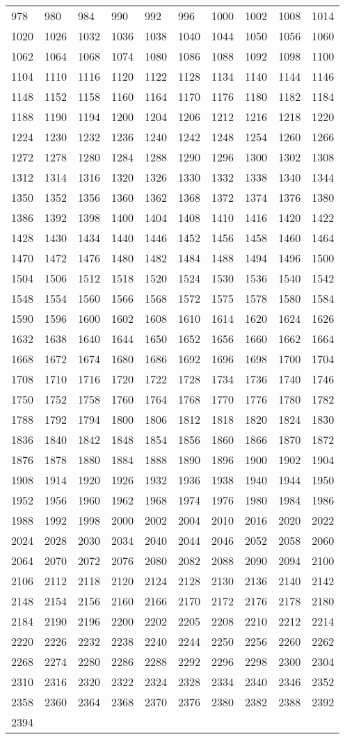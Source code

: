 \begin{longtable}{*{10}{l}}
978&980&984&990&992&996&1000&1002&1008&1014\\
1020&1026&1032&1036&1038&1040&1044&1050&1056&1060\\
1062&1064&1068&1074&1080&1086&1088&1092&1098&1100\\
1104&1110&1116&1120&1122&1128&1134&1140&1144&1146\\
1148&1152&1158&1160&1164&1170&1176&1180&1182&1184\\
1188&1190&1194&1200&1204&1206&1212&1216&1218&1220\\
1224&1230&1232&1236&1240&1242&1248&1254&1260&1266\\
1272&1278&1280&1284&1288&1290&1296&1300&1302&1308\\
1312&1314&1316&1320&1326&1330&1332&1338&1340&1344\\
1350&1352&1356&1360&1362&1368&1372&1374&1376&1380\\
1386&1392&1398&1400&1404&1408&1410&1416&1420&1422\\
1428&1430&1434&1440&1446&1452&1456&1458&1460&1464\\
1470&1472&1476&1480&1482&1484&1488&1494&1496&1500\\
1504&1506&1512&1518&1520&1524&1530&1536&1540&1542\\
1548&1554&1560&1566&1568&1572&1575&1578&1580&1584\\
1590&1596&1600&1602&1608&1610&1614&1620&1624&1626\\
1632&1638&1640&1644&1650&1652&1656&1660&1662&1664\\
1668&1672&1674&1680&1686&1692&1696&1698&1700&1704\\
1708&1710&1716&1720&1722&1728&1734&1736&1740&1746\\
1750&1752&1758&1760&1764&1768&1770&1776&1780&1782\\
1788&1792&1794&1800&1806&1812&1818&1820&1824&1830\\
1836&1840&1842&1848&1854&1856&1860&1866&1870&1872\\
1876&1878&1880&1884&1888&1890&1896&1900&1902&1904\\
1908&1914&1920&1926&1932&1936&1938&1940&1944&1950\\
1952&1956&1960&1962&1968&1974&1976&1980&1984&1986\\
1988&1992&1998&2000&2002&2004&2010&2016&2020&2022\\
2024&2028&2030&2034&2040&2044&2046&2052&2058&2060\\
2064&2070&2072&2076&2080&2082&2088&2090&2094&2100\\
2106&2112&2118&2120&2124&2128&2130&2136&2140&2142\\
2148&2154&2156&2160&2166&2170&2172&2176&2178&2180\\
2184&2190&2196&2200&2202&2205&2208&2210&2212&2214\\
2220&2226&2232&2238&2240&2244&2250&2256&2260&2262\\
2268&2274&2280&2286&2288&2292&2296&2298&2300&2304\\
2310&2316&2320&2322&2324&2328&2334&2340&2346&2352\\
2358&2360&2364&2368&2370&2376&2380&2382&2388&2392\\
2394&\\
\bottomrule\end{longtable}

